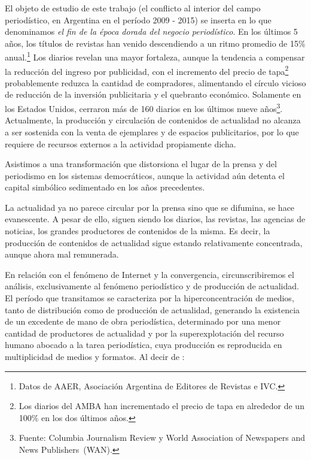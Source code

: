 El objeto de estudio de este trabajo (el conflicto al interior del campo periodístico, en Argentina en el período 2009 - 2015) se inserta en lo que denominamos \emph{el fin de la época dorada del negocio periodístico}. En los últimos 5 años, los títulos de revistas han venido descendiendo a un ritmo promedio de 15\% anual.\footnote{Datos de AAER, Asociación Argentina de Editores de Revistas e IVC.} Los diarios revelan una mayor fortaleza, aunque la tendencia a compensar la reducción del ingreso por publicidad, con el incremento del precio de tapa\footnote{Los diarios del AMBA han incrementado el precio de tapa en alrededor de un 100\% en los dos últimos años.} probablemente reduzca la cantidad de compradores, alimentando el círculo vicioso de reducción de la inversión publicitaria y el quebranto económico. Solamente en los Estados Unidos, cerraron más de 160 diarios en los últimos nueve años\footnote{Fuente: Columbia Journalism Review y World Association of Newspapers and News Publishers (WAN).}. Actualmente, la producción y circulación de contenidos de actualidad no alcanza a ser sostenida con la venta de ejemplares y de espacios publicitarios, por lo que requiere de recursos externos a la actividad propiamente dicha.

Asistimos a una transformación que distorsiona el lugar de la prensa y del periodismo en los sistemas democráticos, aunque la actividad aún detenta el capital simbólico  sedimentado en los años precedentes.

La actualidad ya no parece circular por la prensa  sino que se difumina, se hace evanescente. A pesar de ello, siguen siendo los diarios, las revistas, las agencias de noticias, los grandes productores de contenidos de la misma. Es decir, la producción de contenidos de actualidad sigue estando relativamente concentrada, aunque ahora mal remunerada.

En relación con el fenómeno de Internet y la convergencia, circunscribiremos el análisis, exclusivamente al fenómeno periodístico y de producción de actualidad. El período que transitamos se caracteriza por la hiperconcentración de medios, tanto de distribución como de producción de actualidad, generando la existencia de un excedente de mano de obra periodística, determinado por una menor cantidad de productores de actualidad y por la superexplotación del recurso humano abocado a la tarea periodística, cuya producción es reproducida en multiplicidad de medios y formatos. Al decir de \textcite[266-267]{@6960-WINAZKI2000}:

